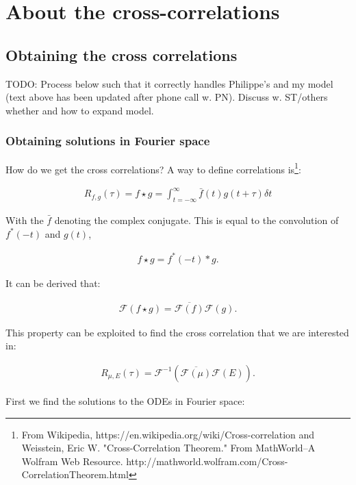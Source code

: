 
\chapter{About the cross-correlations}

\section*{Obtaining the cross correlations}

{\color{red}TODO: Process below such that it correctly handles Philippe's and my model (text above has been updated after phone call w. PN). Discuss w. ST/others whether and how to expand model.}

\subsection*{Obtaining solutions in Fourier space}

How do we get the cross correlations? A way to define correlations is\footnote{From Wikipedia, https://en.wikipedia.org/wiki/Cross-correlation and Weisstein, Eric W. "Cross-Correlation Theorem." From MathWorld--A Wolfram Web Resource. http://mathworld.wolfram.com/Cross-CorrelationTheorem.html}:

\begin{align}
R_{f,g}(\tau) = f \star g = \int_{t=-\infty}^{\infty} {\bar f(t) g(t+\tau) \delta t}
\end{align}

With the $\bar{f}$ denoting the complex conjugate. This is equal to the convolution of $f^*(-t)$ and $g(t)$, 

\begin{align}
f \star g = f^*(-t) * g
.
\end{align}

It can be derived that:

\begin{align}
\mathcal{F} (f \star g) = \overline{\mathcal{F} (f)} \mathcal{F}(g)
.
\end{align}

This property can be exploited to find the cross correlation that we are interested in:

\begin{align}
R_{\mu,E}(\tau) = \mathcal{F}^{-1} \left( \overline{\mathcal{F} (\mu)} \mathcal{F}(E) \right)
.
\end{align}

First we find the solutions to the ODEs in Fourier space:

